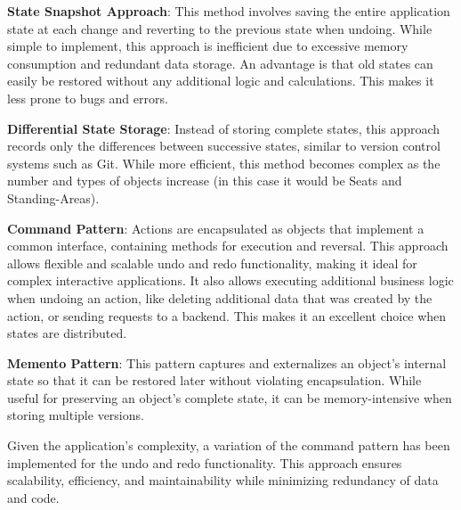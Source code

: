 \begin{compactenum}
\item \textbf{State Snapshot Approach}: This method involves saving the entire application state at each change and reverting to the previous state when undoing. While simple to implement, this approach is inefficient due to excessive memory consumption and redundant data storage. An advantage is that old states can easily be restored without any additional logic and calculations. This makes it less prone to bugs and errors.
\item \textbf{Differential State Storage}: Instead of storing complete states, this approach records only the differences between successive states, similar to version control systems such as Git. While more efficient, this method becomes complex as the number and types of objects increase (in this case it would be Seats and Standing-Areas).
\item \textbf{Command Pattern}: Actions are encapsulated as objects that implement a common interface, containing methods for execution and reversal. This approach allows flexible and scalable undo and redo functionality, making it ideal for complex interactive applications. It also allows executing additional business logic when undoing an action, like deleting additional data that was created by the action, or sending requests to a backend. This makes it an excellent choice when states are distributed.
\item \textbf{Memento Pattern}: This pattern captures and externalizes an object's internal state so that it can be restored later without violating encapsulation. While useful for preserving an object's complete state, it can be memory-intensive when storing multiple versions.
\end{compactenum}

Given the application's complexity, a variation of the command pattern has been implemented for the undo and redo functionality. This approach ensures scalability, efficiency, and maintainability while minimizing redundancy of data and code.


